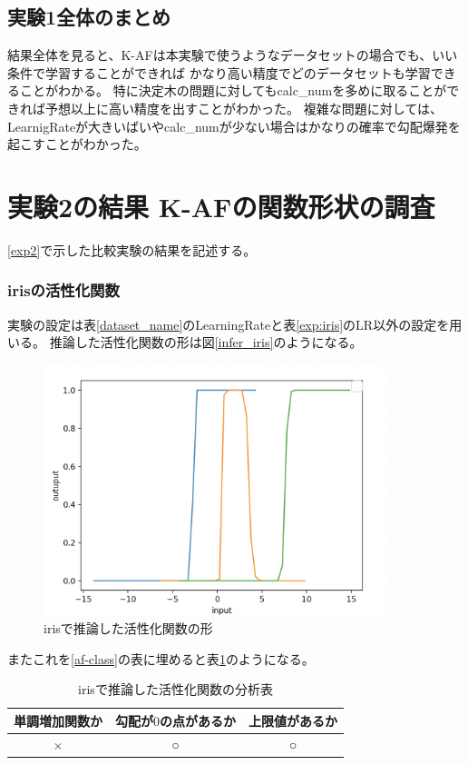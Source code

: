 \subsection{実験1全体のまとめ}
結果全体を見ると、K-AFは本実験で使うようなデータセットの場合でも、いい条件で学習することができれば
かなり高い精度でどのデータセットも学習できることがわかる。
特に決定木の問題に対してもcalc\_numを多めに取ることができれば予想以上に高い精度を出すことがわかった。
複雑な問題に対しては、LearnigRateが大きいばいやcalc\_numが少ない場合はかなりの確率で勾配爆発を起こすことがわかった。


\section{実験2の結果 K-AFの関数形状の調査}
\label{evo2}
\ref{exp2}で示した比較実験の結果を記述する。





\subsubsection{irisの活性化関数}
実験の設定は表\ref{dataset_name}のLearningRateと表\ref{exp:iris}のLR以外の設定を用いる。
推論した活性化関数の形は図\ref{infer_iris}のようになる。
\begin{figure}[hbtp]
    \begin{center}
        \includegraphics[width=10cm]{asset/iris-0.1.png}
            \caption{irisで推論した活性化関数の形}
            \label{ifer_iris}
    \end{center}
\end{figure}

またこれを\ref{af-class}の表に埋めると表\ref{anal_iris}のようになる。
\begin{table}[htbp]
    \begin{center}
        \caption{irisで推論した活性化関数の分析表}
        \label{anal_iris}
        \vspace{2mm} 
        \begin{tabular}{ |c|c|c| }
        単調増加関数か & 勾配が$ 0 $の点があるか & 上限値があるか   \\
        \hline
        × & ○ & ○   \\
        \end{tabular}
    \end{center}
\end{table}




